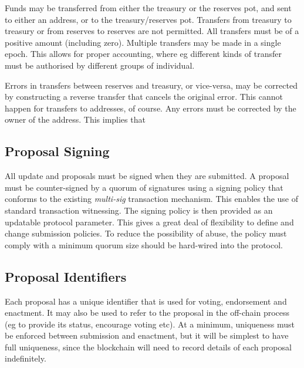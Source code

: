 Funds may be transferred from either the treasury or the reserves pot, and sent to either an address, or to the treasury/reserves pot.
Transfers from treasury to treasury or from reserves to reserves are not permitted.  All transfers must be of a positive amount (including zero).
Multiple transfers may be made in a single epoch.  This allows for proper accounting, where eg different kinds of transfer must
be authorised by different groups of individual.

Errors in transfers between reserves and treasury, or vice-versa, may be corrected by constructing a reverse transfer that cancels the original error.
This cannot happen for transfers to addresses, of course.  Any errors must be corrected by the owner of the address.  This implies that

\subsection{Proposal Signing}

All update and proposals must be signed when they are submitted.  A proposal must be counter-signed by a quorum of signatures using a signing
policy that conforms to the existing \emph{multi-sig} transaction mechanism.  This enables the use of standard transaction witnessing.
The signing policy is then provided as an updatable protocol parameter.  This gives a great deal of flexibility to define and change submission policies.
To reduce the possibility of abuse, the policy must comply with a minimum quorum size should be hard-wired into the protocol.



\subsection{Proposal Identifiers}
\label{sect:proposalid}

Each proposal has a unique identifier that is used for voting, endorsement and enactment.  It may also be used to refer to the proposal in the off-chain process (eg to provide its
status, encourage voting etc).  At a minimum, uniqueness must be enforced between submission and enactment, but it will be simplest to have full uniqueness, since the blockchain will need to record
details of each proposal indefinitely.

